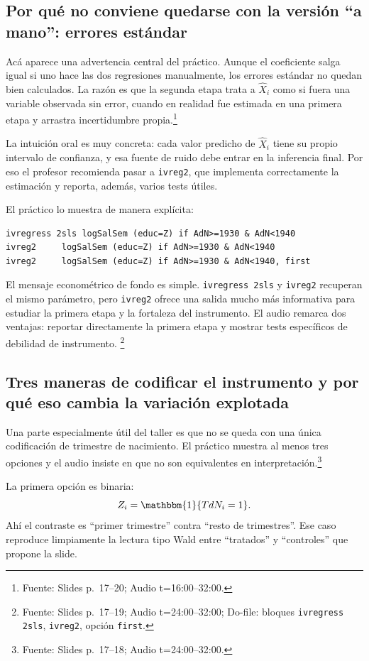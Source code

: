 \documentclass[11pt]{article}
\newcommand{\q}[1]{``#1''}
\newcommand{\source}[2]{\footnote{Fuente: Slides p.~#1; Audio t=#2.}}
\newcommand{\sourced}[3]{\footnote{Fuente: Slides p.~#1; Audio t=#2; Do-file: #3.}}
\begin{document}
\subsection{Por qué no conviene quedarse con la versión \q{a mano}: errores estándar}

Acá aparece una advertencia central del práctico. Aunque el coeficiente salga igual si uno hace las dos regresiones manualmente, los errores estándar no quedan bien calculados. La razón es que la segunda etapa trata a \(\hat X_i\) como si fuera una variable observada sin error, cuando en realidad fue estimada en una primera etapa y arrastra incertidumbre propia.\source{17--20}{16:00--32:00}

La intuición oral es muy concreta: cada valor predicho de \(\hat X_i\) tiene su propio intervalo de confianza, y esa fuente de ruido debe entrar en la inferencia final. Por eso el profesor recomienda pasar a \texttt{ivreg2}, que implementa correctamente la estimación y reporta, además, varios tests útiles.

El práctico lo muestra de manera explícita:
\begin{lstlisting}
ivregress 2sls logSalSem (educ=Z) if AdN>=1930 & AdN<1940
ivreg2     logSalSem (educ=Z) if AdN>=1930 & AdN<1940
ivreg2     logSalSem (educ=Z) if AdN>=1930 & AdN<1940, first
\end{lstlisting}

El mensaje econométrico de fondo es simple. \texttt{ivregress 2sls} y \texttt{ivreg2} recuperan el mismo parámetro, pero \texttt{ivreg2} ofrece una salida mucho más informativa para estudiar la primera etapa y la fortaleza del instrumento. El audio remarca dos ventajas: reportar directamente la primera etapa y mostrar tests específicos de debilidad de instrumento. \sourced{17--19}{24:00--32:00}{bloques \texttt{ivregress 2sls}, \texttt{ivreg2}, opción \texttt{first}}

\subsection{Tres maneras de codificar el instrumento y por qué eso cambia la variación explotada}

Una parte especialmente útil del taller es que no se queda con una única codificación de trimestre de nacimiento. El práctico muestra al menos tres opciones y el audio insiste en que no son equivalentes en interpretación.\source{17--18}{24:00--32:00}

La primera opción es binaria:
\[
Z_i=\mathbbm{1}\{TdN_i=1\}.
\]
Ahí el contraste es \q{primer trimestre} contra \q{resto de trimestres}. Ese caso reproduce limpiamente la lectura tipo Wald entre \q{tratados} y \q{controles} que propone la slide.
\end{document}
